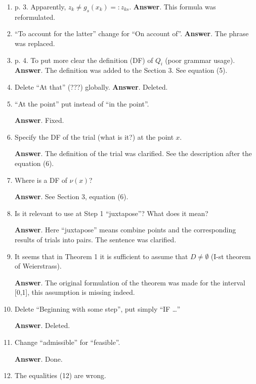 \documentclass{article}%
\begin{document}
\begin{enumerate}
\item p. 3. Apparently, $z_k\neq g_s(x_k ) =:z_{ks}$.
\textbf{Answer}.
This formula was reformulated.

\item  “To account for the latter” change for “On account of”.
\textbf{Answer}.
The phrase was replaced.

\item  p. 4. To put more clear the definition (DF) of $Q_i$ (poor grammar usage).
\textbf{Answer}.
The definition was added to the Section 3. See equation (5).

\item  Delete “At that” (???) globally.
\textbf{Answer}.
Deleted.

\item “At the point” put instead of “in the point”.

\textbf{Answer}.
Fixed.

\item  Specify the DF of the trial (what is it?) at the point $x$.

\textbf{Answer}.
The definition of the trial was clarified. See the description after the equation (6).

\item  Where is a DF of $\nu(x)$?

\textbf{Answer}.
See Section 3, equation (6).

\item  Is it relevant to use at Step 1 “juxtapose”? What does it mean?

\textbf{Answer}.
Here “juxtapose” means combine points and the corresponding results of trials into pairs.
The sentence was clarified.

\item  It seems that in Theorem 1 it is sufficient to assume that $D\neq\emptyset$ (I-st theorem of Weierstrass).

\textbf{Answer}.
The original formulation of the theorem was made for the interval [0,1], this assumption is missing indeed.

\item  Delete “Beginning with some step”, put simply “IF …”

\textbf{Answer}.
Deleted.

\item  Change “admissible” for “feasible”.

\textbf{Answer}.
Done.

\item  The equalities (12) are wrong.


\end{enumerate}
\end{document}
